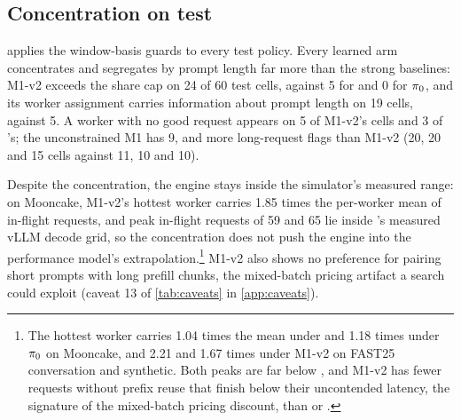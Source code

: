 \subsection{Concentration on test}
\label{sec:gaming-test}

 applies the window-basis guards to every test policy. Every learned arm concentrates
and segregates by prompt length far more than the strong baselines: M1-v2 exceeds the share cap on 24
of 60 test cells, against 5 for  and 0 for $\piref$, and its worker assignment carries
information about prompt length on 19 cells, against 5. A worker with no good request appears on 5
of M1-v2's cells and 3 of 's; the unconstrained M1 has 9, and more long-request flags
than M1-v2 (20, 20 and 15 cells against 11, 10 and 10).

\begin{table}[tbp]
  \centering
  \caption{Concentration and long-request flags on test, counts of the 60 test cells.
    Share $>$ cap: the window-basis largest worker request share exceeds
    $\min(2/\Nw, 1/\Nw + 0.25)$. NMI: normalized mutual information between worker and prompt-length
    quartile above 0.10. $\geq$32K, $\geq$64K, top decile: the good fraction of those prompts is more
    than 0.05 below $\piref$'s. Worker with no good request: a worker with 0\% good in-window
    requests. Last column: mean over cells of the smallest per-worker good fraction.}
  \label{tab:lr13}
  
\end{table}

Despite the concentration, the engine stays inside the simulator's measured range: on Mooncake, M1-v2's
hottest worker carries 1.85 times the per-worker mean of in-flight requests, and peak in-flight
requests of 59 and 65 lie inside \ais{}'s measured vLLM decode grid, so the concentration does not
push the engine into the performance model's extrapolation.\footnote{The hottest worker carries 1.04
  times the mean under  and 1.18 times under $\piref$ on Mooncake, and 2.21 and 1.67
  times under M1-v2 on FAST25 conversation and synthetic. Both peaks are far below
  , and M1-v2 has fewer requests without prefix reuse that finish below their
  uncontended latency, the signature of the mixed-batch pricing discount, than  or
  .} M1-v2 also shows no preference for pairing
short prompts with long prefill chunks, the mixed-batch pricing artifact a search could exploit
(caveat 13 of \cref{tab:caveats} in \cref{app:caveats}).

